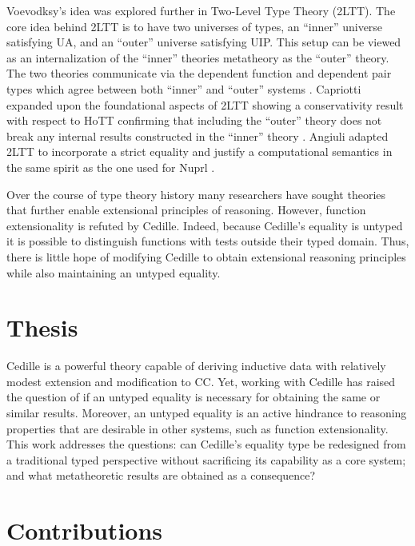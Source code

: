 Voevodksy's idea was explored further in Two-Level Type Theory (2LTT).
The core idea behind 2LTT is to have two universes of types, an ``inner'' universe satisfying UA, and an ``outer'' universe satisfying UIP.
This setup can be viewed as an internalization of the ``inner'' theories metatheory as the ``outer'' theory.
The two theories communicate via the dependent function and dependent pair types which agree between both ``inner'' and ``outer'' systems \cite{annenkov2023}.
Capriotti expanded upon the foundational aspects of 2LTT showing a conservativity result with respect to HoTT confirming that including the ``outer'' theory does not break any internal results constructed in the ``inner'' theory \cite{capriotti2017}.
Angiuli adapted 2LTT to incorporate a strict equality and justify a computational semantics in the same spirit as the one used for Nuprl \cite{angiuli2019}.

Over the course of type theory history many researchers have sought theories that further enable extensional principles of reasoning.
However, function extensionality is refuted by Cedille.
Indeed, because Cedille's equality is untyped it is possible to distinguish functions with tests outside their typed domain.
Thus, there is little hope of modifying Cedille to obtain extensional reasoning principles while also maintaining an untyped equality.

\section{Thesis}

Cedille is a powerful theory capable of deriving inductive data with relatively modest extension and modification to CC.
Yet, working with Cedille has raised the question of if an untyped equality is necessary for obtaining the same or similar results.
Moreover, an untyped equality is an active hindrance to reasoning properties that are desirable in other systems, such as function extensionality.
This work addresses the questions: can Cedille's equality type be redesigned from a traditional typed perspective without sacrificing its capability as a core system; and what metatheoretic results are obtained as a consequence?

\section{Contributions}

